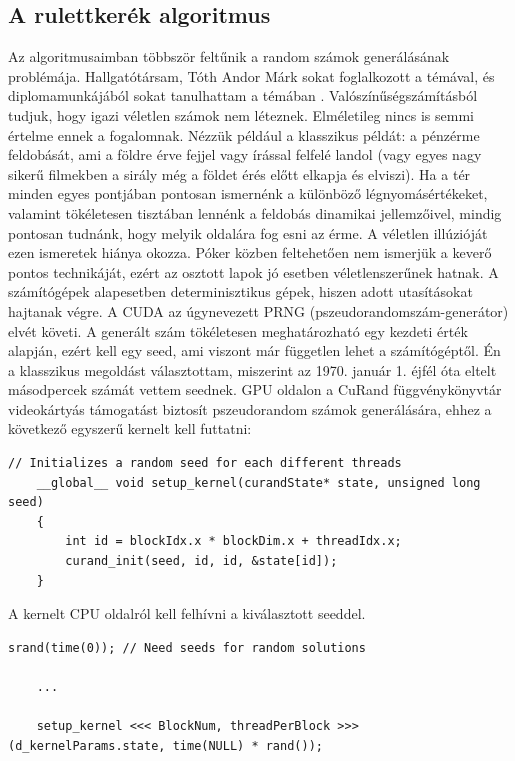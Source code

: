 \subsection{A rulettkerék algoritmus }
Az algoritmusaimban többször feltűnik a random számok generálásának problémája. Hallgatótársam, Tóth Andor Márk sokat foglalkozott a témával, és diplomamunkájából sokat tanulhattam a témában \cite{alg_optim}. Valószínűségszámításból tudjuk, hogy igazi véletlen számok nem léteznek. Elméletileg nincs is semmi értelme ennek a fogalomnak. Nézzük például a klasszikus példát: a pénzérme feldobását, ami a földre érve fejjel vagy írással felfelé landol (vagy egyes nagy sikerű filmekben a sirály még a földet érés előtt elkapja és elviszi). Ha a tér minden egyes pontjában pontosan ismernénk a különböző légnyomásértékeket, valamint tökéletesen tisztában lennénk a feldobás dinamikai jellemzőivel, mindig pontosan tudnánk, hogy melyik oldalára fog esni az érme. A véletlen illúzióját ezen ismeretek hiánya okozza. Póker közben feltehetően nem ismerjük a keverő pontos technikáját, ezért az osztott lapok jó esetben véletlenszerűnek hatnak. A számítógépek alapesetben determinisztikus gépek, hiszen adott utasításokat hajtanak végre. 
A CUDA az úgynevezett PRNG (pszeudorandomszám-generátor) elvét követi. A generált szám tökéletesen meghatározható egy kezdeti érték alapján, ezért kell egy seed, ami viszont már független lehet a számítógéptől. Én a klasszikus megoldást választottam, miszerint az 1970. január 1. éjfél óta eltelt másodpercek számát vettem seednek.
GPU oldalon a CuRand függvénykönyvtár videokártyás támogatást biztosít pszeudorandom számok generálására, ehhez a következő egyszerű kernelt kell futtatni:

\begin{lstlisting}[style=CStyle]
	// Initializes a random seed for each different threads
	__global__ void setup_kernel(curandState* state, unsigned long seed)
	{
		int id = blockIdx.x * blockDim.x + threadIdx.x;
		curand_init(seed, id, id, &state[id]);
	}
\end{lstlisting}

A kernelt CPU oldalról kell felhívni a kiválasztott seeddel.

\begin{lstlisting}[style=CStyle]
	srand(time(0)); // Need seeds for random solutions
	
	...
	
	setup_kernel <<< BlockNum, threadPerBlock >>> (d_kernelParams.state, time(NULL) * rand());
\end{lstlisting}

